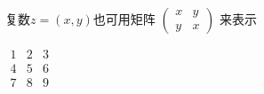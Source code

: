 \documentclass[UTF8]{ctexart}
\begin{document}
复数$z=(x,y)$也可用矩阵
$
\left(
\begin{smallmatrix}
    x & y \\ y & x
\end{smallmatrix}
\right)
$
来表示

$
\begin{array}{r|r|r}
    1 & 2 & 3\\
    \hline %
    4 & 5 & 6\\
    \hline
    7 & 8 & 9
\end{array}
$
\end{document}
